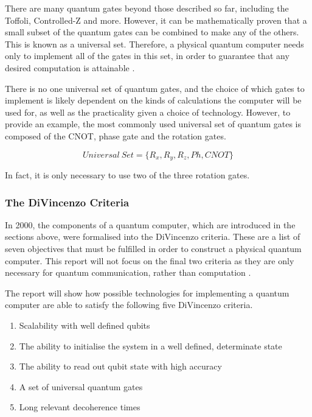 There are many quantum gates beyond those described so far, including the Toffoli, Controlled-Z and more. However, it can be mathematically proven that a small subset of the quantum gates can be combined to make any of the others. This is known as a universal set. Therefore, a physical quantum computer needs only to implement all of the gates in this set, in order to guarantee that any desired computation is attainable \cite{universalset}.

There is no one universal set of quantum gates, and the choice of which gates to implement is likely dependent on the kinds of calculations the computer will be used for, as well as the practicality given a choice of technology. However, to provide an example, the most commonly used universal set of quantum gates is composed of the CNOT, phase gate and the rotation gates.

\begin{equation}
    Universal\ Set = \{ R_x, R_y, R_z, Ph, CNOT \}
\end{equation}

In fact, it is only necessary to use two of the three rotation gates.

\subsubsection{The DiVincenzo Criteria}
In 2000, the components of a quantum computer, which are introduced in the sections above, were formalised into the DiVincenzo criteria. These are a list of seven objectives that must be fulfilled in order to construct a physical quantum computer. This report will not focus on the final two criteria as they are only necessary for quantum communication, rather than computation \cite{bergou_quantum_2021}.

The report will show how possible technologies for implementing a quantum computer are able to satisfy the following five DiVincenzo criteria.
\begin{enumerate}
    \item Scalability with well defined qubits
    \item The ability to initialise the system in a well defined, determinate state
    \item The ability to read out qubit state with high accuracy
    \item A set of universal quantum gates
    \item Long relevant decoherence times
    \setcounter{enumTemp}{\theenumi}
\end{enumerate}

